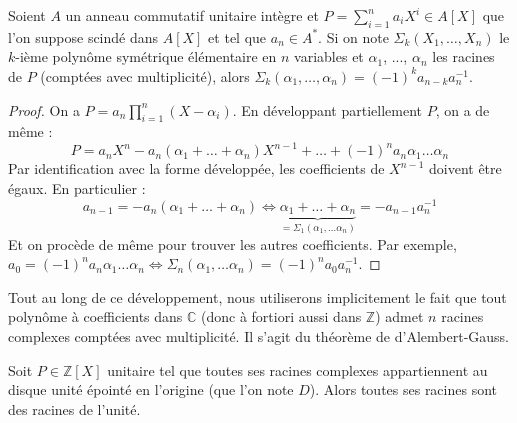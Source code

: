 





  \begin{lemma}
    \label{theoreme-de-kronecker-1}
    Soient $A$ un anneau commutatif unitaire intègre et $P = \sum_{i=1}^n a_iX^i \in A[X]$ que l'on suppose scindé dans $A[X]$ et tel que $a_n \in A^*$. Si on note $\Sigma_k(X_1, \dots, X_n)$ le $k$-ième polynôme symétrique élémentaire en $n$ variables et $\alpha_1$, ..., $\alpha_n$ les racines de $P$ (comptées avec multiplicité), alors $\Sigma_k(\alpha_1, \dots, \alpha_n) = (-1)^k a_{n-k} a_n^{-1}$.
  \end{lemma}

  \begin{proof}
    On a $P = a_n \prod_{i=1}^n (X-\alpha_i)$. En développant partiellement $P$, on a de même :
    \[ P = a_n X^n - a_n (\alpha_1 + \dots + \alpha_n)X^{n-1} + \dots + (-1)^n a_n \alpha_1 \dots \alpha_n \]
    Par identification avec la forme développée, les coefficients de $X^{n-1}$ doivent être égaux. En particulier :
    \[ a_{n-1} = -a_n (\alpha_1 + \dots + \alpha_n) \iff \underbrace{\alpha_1 + \dots + \alpha_n}_{= \Sigma_1(\alpha_1, \dots \alpha_n)} = - a_{n-1} a_n^{-1} \]
    Et on procède de même pour trouver les autres coefficients. Par exemple, $a_0 = (-1)^n a_n \alpha_1 \dots \alpha_n \iff \Sigma_n(\alpha_1, \dots \alpha_n) = (-1)^n a_0 a_n^{-1}$.
  \end{proof}

  \begin{remark}
    Tout au long de ce développement, nous utiliserons implicitement le fait que tout polynôme à coefficients dans $\mathbb{C}$ (donc à fortiori aussi dans $\mathbb{Z}$) admet $n$ racines complexes comptées avec multiplicité. Il s'agit du théorème de d'Alembert-Gauss.
  \end{remark}


  \begin{theorem}
    \label{theoreme-de-kronecker-2}
    Soit $P \in \mathbb{Z}[X]$ unitaire tel que toutes ses racines complexes appartiennent au disque unité épointé en l'origine (que l'on note $D$). Alors toutes ses racines sont des racines de l'unité.
  \end{theorem}

